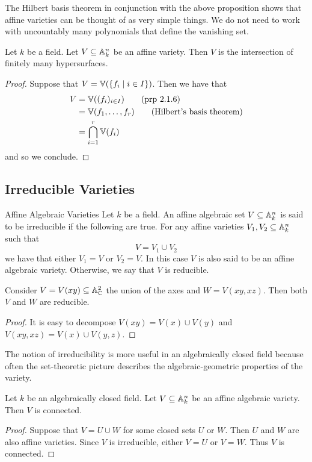 \documentclass[a4paper]{article}
\begin{document}
The Hilbert basis theorem in conjunction with the above proposition shows that affine varieties can be thought of as very simple things. We do not need to work with uncountably many polynomials that define the vanishing set. 

\begin{crl}{}{} Let $k$ be a field. Let $V\subseteq\mathbb{A}_k^n$ be an affine variety. Then $V$ is the intersection of finitely many hypersurfaces. \tcbline
\begin{proof}
Suppose that $V=\mathbb{V}(\{f_i\;|\;i\in I\})$. Then we have that 
\begin{align*}
V&=\mathbb{V}((f_i)_{i\in I})\tag{prp 2.1.6}\\
&=\mathbb{V}(f_1,\dots,f_r)\tag{Hilbert's basis theorem}\\
&=\bigcap_{i=1}^r\mathbb{V}(f_i)
\end{align*}
and so we conclude. 
\end{proof}
\end{crl}

\subsection{Irreducible Varieties}
\begin{defn}{Affine Algebraic Varieties}{} Let $k$ be a field. An affine algebraic set $V\subseteq\mathbb{A}_k^n$ is said to be irreducible if the following are true. For any affine varieties $V_1,V_2\subseteq\mathbb{A}_k^n$ such that $$V=V_1\cup V_2$$ we have that either $V_1=V$ or $V_2=V$. In this case $V$ is also said to be an affine algebraic variety. Otherwise, we say that $V$ is reducible. 
\end{defn}

\begin{eg}{}{} Consider $V=V(xy)\subseteq\mathbb{A}_{\mathbb{C}}^2$ the union of the axes and $W=V(xy,xz)$. Then both $V$ and $W$ are reducible. \tcbline
\begin{proof}
It is easy to decompose $V(xy)=V(x)\cup V(y)$ and $V(xy,xz)=V(x)\cup V(y,z)$. 
\end{proof}
\end{eg}

The notion of irreducibility is more useful in an algebraically closed field because often the set-theoretic picture describes the algebraic-geometric properties of the variety. 

\begin{prp}{}{} Let $k$ be an algebraically closed field. Let $V\subseteq\mathbb{A}_k^n$ be an affine algebraic variety. Then $V$ is connected. \tcbline
\begin{proof}
Suppose that $V=U\cup W$ for some closed sets $U$ or $W$. Then $U$ and $W$ are also affine varieties. Since $V$ is irreducible, either $V=U$ or $V=W$. Thus $V$ is connected. 
\end{proof}
\end{prp}
\end{document}
